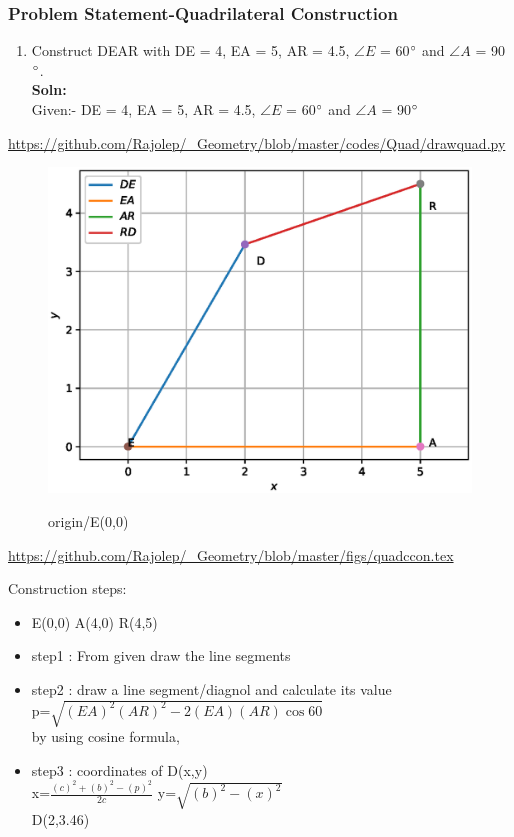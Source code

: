 \begin{frame}
\frametitle{Problem Statement-Quadrilateral Construction}
\begin{enumerate}[label=(\roman*)]
\item Construct DEAR with DE = 4, EA = 5, AR = 4.5, $\angle {E}$ = 60$\degree$ and $\angle {A}$ = 90$\degree$.\\
\textbf{Soln:}\\
Given:-  DE = 4, EA = 5, AR = 4.5, $\angle {E}$ = 60$\degree$ and $\angle {A}$ = 90$\degree$\\
  \end{enumerate}
\url{https://github.com/Rajolep/_Geometry/blob/master/codes/Quad/drawquad.py}
\begin{figure}
\includegraphics[scale=0.4]{./figs/quadcon.eps}
\end{figure}
\end{frame}
\begin{frame}
\begin{figure}
origin/E(0,0)

\end{figure}
\url{https://github.com/Rajolep/_Geometry/blob/master/figs/quadccon.tex}
\end{frame}
\begin{frame}
Construction steps:
\begin{itemize}
\item E(0,0)  A(4,0) R(4,5)
\item step1 : From given draw the line segments
\item step2 : draw a line segment/diagnol and calculate its value \\
    p=$\sqrt{(EA)^2(AR)^2-2(EA)(AR)\cos{60}}$\\
     by using cosine formula,\\
 \item step3 : coordinates of D(x,y)   \\x=$\frac{(c)^2+(b)^2-(p)^2}{2c}$ y=$\sqrt{(b)^2-(x)^2}$   \\
     D(2,3.46)
     
\end{itemize}
\end{frame}
